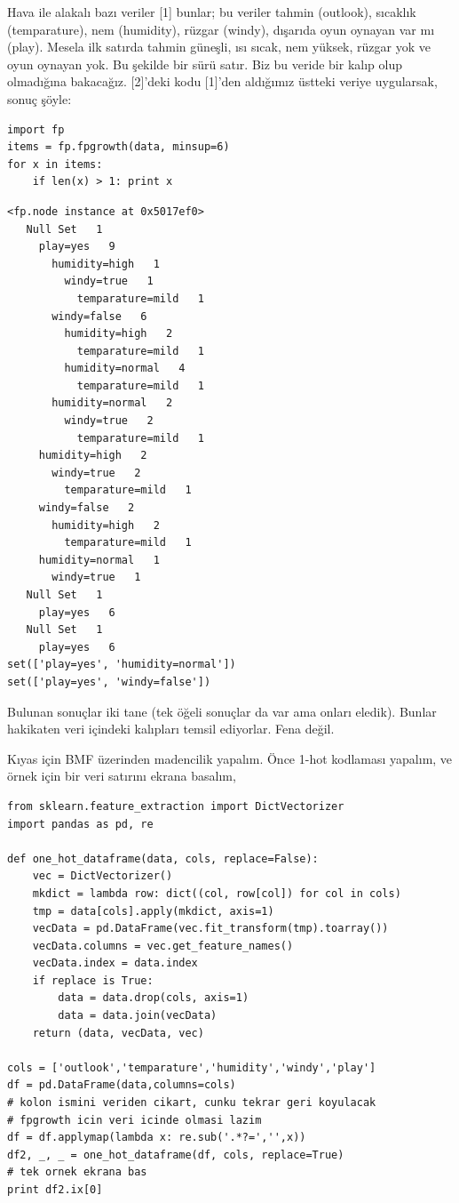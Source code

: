 \documentclass[12pt,fleqn]{article}\usepackage{../../common}
\begin{document}
Hava ile alakalı bazı veriler [1] bunlar; bu veriler tahmin (outlook),
sıcaklık (temparature), nem (humidity), rüzgar (windy), dışarıda oyun
oynayan var mı (play). Mesela ilk satırda tahmin güneşli, ısı sıcak, nem
yüksek, rüzgar yok ve oyun oynayan yok. Bu şekilde bir sürü satır. Biz bu
veride bir kalıp olup olmadığına bakacağız. [2]'deki kodu [1]'den aldığımız
üstteki veriye uygularsak, sonuç şöyle:

\begin{verbatim}
import fp
items = fp.fpgrowth(data, minsup=6)
for x in items:
    if len(x) > 1: print x
\end{verbatim}

\begin{verbatim}
<fp.node instance at 0x5017ef0>
   Null Set   1
     play=yes   9
       humidity=high   1
         windy=true   1
           temparature=mild   1
       windy=false   6
         humidity=high   2
           temparature=mild   1
         humidity=normal   4
           temparature=mild   1
       humidity=normal   2
         windy=true   2
           temparature=mild   1
     humidity=high   2
       windy=true   2
         temparature=mild   1
     windy=false   2
       humidity=high   2
         temparature=mild   1
     humidity=normal   1
       windy=true   1
   Null Set   1
     play=yes   6
   Null Set   1
     play=yes   6
set(['play=yes', 'humidity=normal'])
set(['play=yes', 'windy=false'])
\end{verbatim}

Bulunan sonuçlar iki tane (tek öğeli sonuçlar da var ama onları
eledik). Bunlar hakikaten veri içindeki kalıpları temsil ediyorlar. Fena
değil. 

Kıyas için BMF üzerinden madencilik yapalım. Önce 1-hot kodlaması yapalım,
ve örnek için bir veri satırını ekrana basalım,

\begin{verbatim}
from sklearn.feature_extraction import DictVectorizer
import pandas as pd, re

def one_hot_dataframe(data, cols, replace=False):
    vec = DictVectorizer()
    mkdict = lambda row: dict((col, row[col]) for col in cols)
    tmp = data[cols].apply(mkdict, axis=1)
    vecData = pd.DataFrame(vec.fit_transform(tmp).toarray())
    vecData.columns = vec.get_feature_names()
    vecData.index = data.index
    if replace is True:
        data = data.drop(cols, axis=1)
        data = data.join(vecData)
    return (data, vecData, vec)

cols = ['outlook','temparature','humidity','windy','play']
df = pd.DataFrame(data,columns=cols)
# kolon ismini veriden cikart, cunku tekrar geri koyulacak
# fpgrowth icin veri icinde olmasi lazim
df = df.applymap(lambda x: re.sub('.*?=','',x))
df2, _, _ = one_hot_dataframe(df, cols, replace=True)
# tek ornek ekrana bas
print df2.ix[0]
\end{verbatim}
\end{document}
